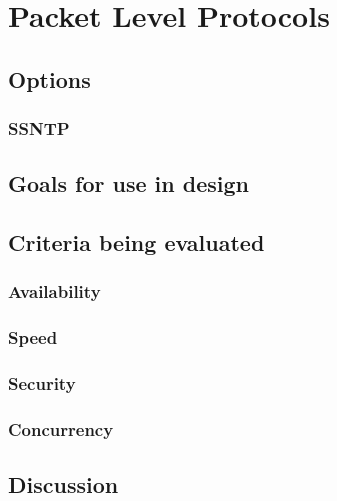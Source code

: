 \documentclass[10pt,letterpaper,onecolumn,draftclsnofoot]{IEEEtran}
\begin{document}
\section{Packet Level Protocols}

\subsection{Options}

\subsubsection{SSNTP}

\subsubsection{}

\subsubsection{}

\subsection{Goals for use in design}

\subsection{Criteria being evaluated}

\subsubsection{Availability}

\subsubsection{Speed}

\subsubsection{Security}

\subsubsection{Concurrency}

\subsection{Discussion}
\end{document}
